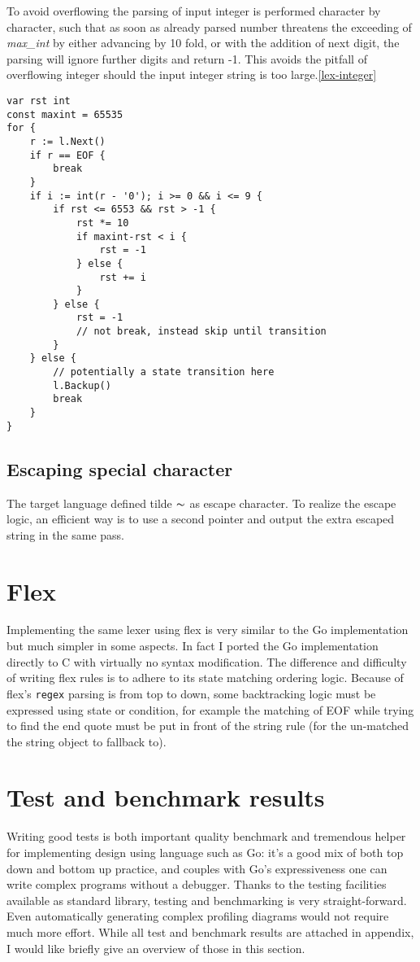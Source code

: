 \documentclass[%
 aip,
 jmp,%
 amsmath,amssymb,
 reprint,%
]{revtex4-1}
\begin{document}
To avoid overflowing the parsing of input integer is performed character by character, such that as soon as already parsed number threatens the exceeding of \textit{max\_int} by either advancing by 10 fold, or with the addition of next digit, the parsing will ignore further digits and return -1. This avoids the pitfall of overflowing integer should the input integer string is too large.\ref{lex-integer}
\begin{widetext}
\begin{lstlisting}[label=lex-integer,caption=lexInteger]
var rst int
const maxint = 65535
for {
	r := l.Next()
	if r == EOF {
		break
	}
	if i := int(r - '0'); i >= 0 && i <= 9 {
		if rst <= 6553 && rst > -1 {
			rst *= 10
			if maxint-rst < i {
				rst = -1
			} else {
				rst += i
			}
		} else {
			rst = -1
			// not break, instead skip until transition
		}
	} else {
		// potentially a state transition here
		l.Backup()
		break
	}
}	
\end{lstlisting}
\end{widetext}

\subsection{Escaping special character}
The target language defined tilde $\thicksim$ as escape character. To realize the escape logic, an efficient way is to use a second pointer and output the extra escaped string in the same pass.

\section{Flex}
Implementing the same lexer using flex is very similar to the Go implementation but much simpler in some aspects. In fact I ported the Go implementation directly to C with virtually no syntax modification. The difference and difficulty of writing flex rules is to adhere to its state matching ordering logic. Because of flex's \texttt{regex} parsing is from top to down, some backtracking logic must be expressed using state or condition, for example the matching of EOF while trying to find the end quote must be put in front of the string rule (for the un-matched the string object to fallback to).

\section{Test and benchmark results}
Writing good tests is both important quality benchmark and tremendous helper for implementing design using language such as Go: it's a good mix of both top down and bottom up practice, and couples with Go's expressiveness one can write complex programs without a debugger. Thanks to the testing facilities available as standard library, testing and benchmarking is very straight-forward. Even automatically generating complex profiling diagrams would not require much more effort.
While all test and benchmark results are attached in appendix, I would like briefly give an overview of those in this section.
\end{document}
